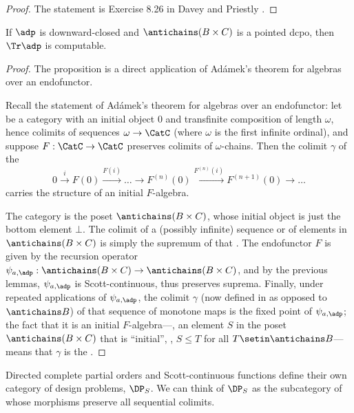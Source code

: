 \begin{proof}
    The statement is Exercise 8.26 in Davey and Priestly \citeXXX.
\end{proof}




\begin{proposition}
    If $\adp$ is downward-closed and $\antichains (B \times C)$ is a pointed dcpo, then $\Tr \adp$ is computable.
\end{proposition}

\begin{proof}
    The proposition is a direct application of Ad\'amek's theorem for algebras over an endofunctor.

    Recall the statement of Ad\'amek's theorem for algebras over an endofunctor: let \CatC be a category with an initial object $0$ and transfinite composition of length $\omega$, hence colimits of sequences $\omega \to \CatC$ (where $\omega$ is the first infinite ordinal), and suppose $F: \CatC \to \CatC$ preserves colimits of $\omega$-chains.
    Then the colimit $\gamma$ of the 
    \begin{equation}
        0 \overset{i}{\to} F(0) \overset{F(i)}{\to} \ldots \to F^{(n)}(0) \overset{F^{(n)}(i)}{\to} F^{(n+1)}(0) \to \ldots
    \end{equation}
    carries the structure of an initial $F$-algebra.

    The category \CatC is the poset $\antichains (B \times C)$, whose initial object is just the bottom element $\bot$.
    The colimit of a (possibly infinite) sequence or   of elements in $\antichains (B\times C)$ is simply the supremum of that .
    The endofunctor $F$ is given by the recursion operator $\psi_{a,\adp} : \antichains (B\times C) \to \antichains (B\times C)$, and by the previous lemmas, $\psi_{a,\adp}$ is Scott-continuous, thus preserves suprema.
    Finally, under repeated applications of $\psi_{a,\adp}$, the colimit $\gamma$ (now defined in \Pos as opposed to $\antichains B$) of that sequence of monotone maps is the fixed point of $\psi_{a,\adp}$; the fact that it is an initial $F$-algebra---\ie,  an element $S$ in the poset $\antichains (B\times C)$ that is ``initial'', \ie,  $S \leq T$ for all $T \setin \antichains B$---means that $\gamma$ is the .
\end{proof}
Directed complete partial orders and Scott-continuous functions define their own category of design problems, $\DP_S$.
We can think of $\DP_S$ as the subcategory of \DP whose morphisms preserve all sequential colimits.

